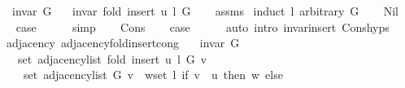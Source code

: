 \begin{isabellebody}
\ \ \ {\isachardoublequoteopen}invar\ G{\isachardoublequoteclose}\isanewline
\ \ \ {\isachardoublequoteopen}invar\ {\isacharparenleft}{\kern0pt}fold\ {\isacharparenleft}{\kern0pt}insert{\isacharprime}{\kern0pt}\ u{\isacharparenright}{\kern0pt}\ l\ G{\isacharparenright}{\kern0pt}{\isachardoublequoteclose}\isanewline
%
\isadelimproof
\ \ %
\endisadelimproof
%
\isatagproof
{}\isamarkupfalse%
\ assms\isanewline
{}\isamarkupfalse%
\ {\isacharparenleft}{\kern0pt}induct\ l\ arbitrary{\isacharcolon}{\kern0pt}\ G{\isacharparenright}{\kern0pt}\isanewline
\ \ \isamarkupfalse%
\ Nil\isanewline
\ \ \isamarkupfalse%
\ {\isacharquery}{\kern0pt}case\isanewline
\ \ \ \ \isamarkupfalse%
\ simp\isanewline
{}\isamarkupfalse%
\isanewline
\ \ \isamarkupfalse%
\ Cons\isanewline
\ \ \isamarkupfalse%
\ {\isacharquery}{\kern0pt}case\isanewline
\ \ \ \ \isamarkupfalse%
\ {\isacharparenleft}{\kern0pt}auto\ intro{\isacharcolon}{\kern0pt}\ invar{\isacharunderscore}{\kern0pt}insert{\isacharprime}{\kern0pt}\ Cons{\isachardot}{\kern0pt}hyps{\isacharparenright}{\kern0pt}\isanewline
{}\isamarkupfalse%
%
\endisatagproof
{\isafoldproof}%
%
\isadelimproof
\isanewline
%
\endisadelimproof
\isanewline
{}\isamarkupfalse%
\ {\isacharparenleft}{\kern0pt}\ adjacency{\isacharparenright}{\kern0pt}\ adjacency{\isacharunderscore}{\kern0pt}fold{\isacharunderscore}{\kern0pt}insert{\isacharprime}{\kern0pt}{\isacharunderscore}{\kern0pt}cong{\isacharcolon}{\kern0pt}\isanewline
\ \ \ {\isachardoublequoteopen}invar\ G{\isachardoublequoteclose}\isanewline
\ \ \isanewline
\ \ \ \ {\isachardoublequoteopen}set\ {\isacharparenleft}{\kern0pt}adjacency{\isacharunderscore}{\kern0pt}list\ {\isacharparenleft}{\kern0pt}fold\ {\isacharparenleft}{\kern0pt}insert{\isacharprime}{\kern0pt}\ u{\isacharparenright}{\kern0pt}\ l\ G{\isacharparenright}{\kern0pt}\ v{\isacharparenright}{\kern0pt}\ {\isacharequal}{\kern0pt}\isanewline
\ \ \ \ \ set\ {\isacharparenleft}{\kern0pt}adjacency{\isacharunderscore}{\kern0pt}list\ G\ v{\isacharparenright}{\kern0pt}\ {\isasymunion}\ {\isacharparenleft}{\kern0pt}{\isasymUnion}w{\isasymin}set\ l{\isachardot}{\kern0pt}\ if\ v\ {\isacharequal}{\kern0pt}\ u\ then\ {\isacharbraceleft}{\kern0pt}w{\isacharbraceright}{\kern0pt}\ else\ {\isacharbraceleft}{\kern0pt}{\isacharbraceright}{\kern0pt}{\isacharparenright}{\kern0pt}{\isachardoublequoteclose}\isanewline

\end{isabellebody}
